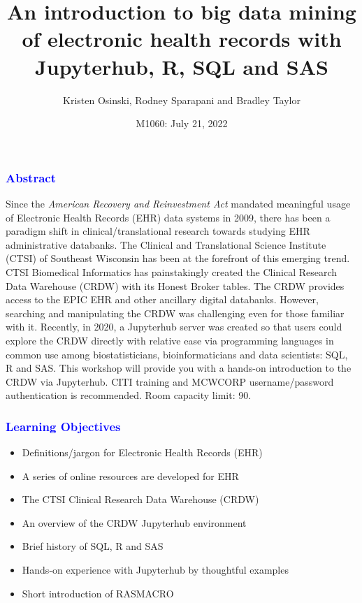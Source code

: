 \documentclass[11pt,pdftex,dvipsnames,usenames]{beamer}
\title{An introduction to big data mining of electronic health records with
Jupyterhub, R, SQL and SAS}
\author{Kristen Osinski, Rodney Sparapani and Bradley Taylor}
\date{M1060: July 21, 2022}
\begin{document}


\titlepage
\boldmath

\begin{frame}[fragile]\frametitle{\bf\textcolor{blue}{Abstract}}
  Since the \emph{American Recovery and Reinvestment Act} mandated
  meaningful usage of Electronic Health Records (EHR) data systems in
  2009, there has been a paradigm shift in clinical/translational
  research towards studying EHR administrative databanks.  The
  Clinical and Translational Science Institute (CTSI) of Southeast
  Wisconsin has been at the forefront of this emerging trend.  CTSI
  Biomedical Informatics has painstakingly created the Clinical
  Research Data Warehouse (CRDW) with its Honest Broker tables.  The
  CRDW provides access to the EPIC EHR and other ancillary digital
  databanks. However, searching and manipulating the CRDW was
  challenging even for those familiar with it.  Recently, in 2020, a
  Jupyterhub server was created so that users could explore the CRDW
  directly with relative ease via programming languages in common use
  among biostatisticians, bioinformaticians and data scientists: SQL,
  R and SAS.  This workshop will provide you with a hands-on
  introduction to the CRDW via Jupyterhub.  CITI training and MCWCORP
  username/password authentication is recommended.  Room capacity
  limit: 90.
\end{frame}
 
\begin{frame}[fragile]\frametitle{\bf\textcolor{blue}{Learning
      Objectives}}
\begin{itemize}
\item Definitions/jargon for Electronic Health Records (EHR)
\item A series of online resources are developed for EHR
\item The CTSI Clinical Research Data Warehouse (CRDW)
\item An overview of the CRDW Jupyterhub environment 
\item Brief history of SQL, R and SAS
\item Hands-on experience with Jupyterhub by thoughtful examples
\item Short introduction of RASMACRO 
\end{itemize}
\end{frame}
\end{document}
